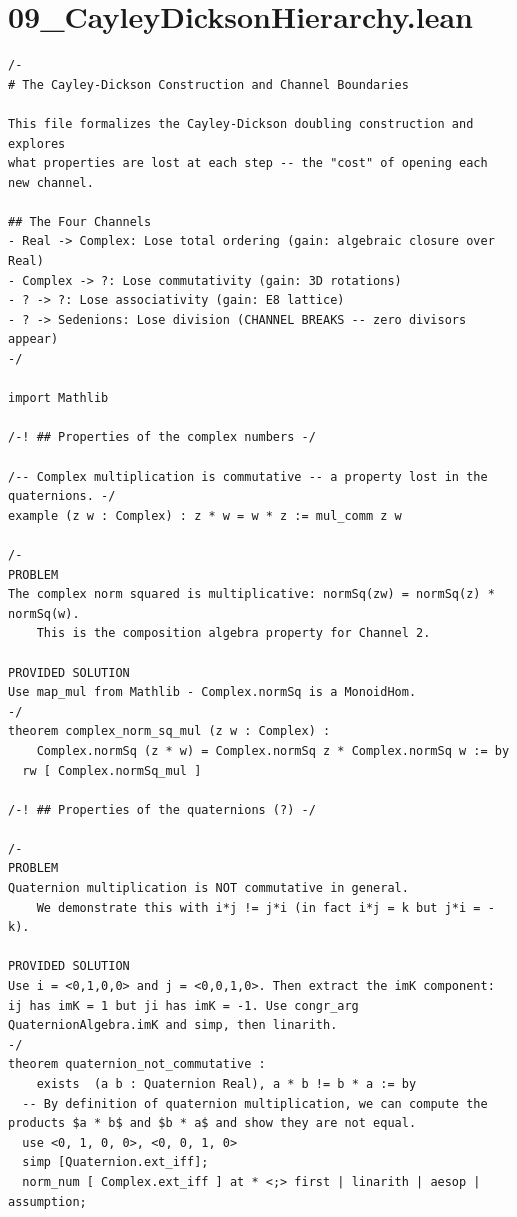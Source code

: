 \documentclass[11pt,twoside,openright]{book}
\theoremstyle{definition}
\theoremstyle{remark}
\begin{document}
\clearpage

\section*{09\_CayleyDicksonHierarchy.lean}

\begin{lstlisting}[style=lean]
/-
# The Cayley-Dickson Construction and Channel Boundaries

This file formalizes the Cayley-Dickson doubling construction and explores
what properties are lost at each step -- the "cost" of opening each new channel.

## The Four Channels
- Real -> Complex: Lose total ordering (gain: algebraic closure over Real)
- Complex -> ?: Lose commutativity (gain: 3D rotations)
- ? -> ?: Lose associativity (gain: E8 lattice)
- ? -> Sedenions: Lose division (CHANNEL BREAKS -- zero divisors appear)
-/

import Mathlib

/-! ## Properties of the complex numbers -/

/-- Complex multiplication is commutative -- a property lost in the quaternions. -/
example (z w : Complex) : z * w = w * z := mul_comm z w

/-
PROBLEM
The complex norm squared is multiplicative: normSq(zw) = normSq(z) * normSq(w).
    This is the composition algebra property for Channel 2.

PROVIDED SOLUTION
Use map_mul from Mathlib - Complex.normSq is a MonoidHom.
-/
theorem complex_norm_sq_mul (z w : Complex) :
    Complex.normSq (z * w) = Complex.normSq z * Complex.normSq w := by
  rw [ Complex.normSq_mul ]

/-! ## Properties of the quaternions (?) -/

/-
PROBLEM
Quaternion multiplication is NOT commutative in general.
    We demonstrate this with i*j != j*i (in fact i*j = k but j*i = -k).

PROVIDED SOLUTION
Use i = <0,1,0,0> and j = <0,0,1,0>. Then extract the imK component: ij has imK = 1 but ji has imK = -1. Use congr_arg QuaternionAlgebra.imK and simp, then linarith.
-/
theorem quaternion_not_commutative :
    exists  (a b : Quaternion Real), a * b != b * a := by
  -- By definition of quaternion multiplication, we can compute the products $a * b$ and $b * a$ and show they are not equal.
  use <0, 1, 0, 0>, <0, 0, 1, 0>
  simp [Quaternion.ext_iff];
  norm_num [ Complex.ext_iff ] at * <;> first | linarith | aesop | assumption;


\end{lstlisting}
\end{document}
